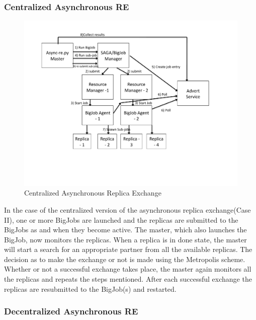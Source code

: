 \documentclass[a4paper,10pt]{article}
\begin{document}
\subsubsection{Centralized Asynchronous RE}

\begin{figure}
\centering
\includegraphics[scale=0.50]{figures/centralized_architecture}
\caption{\small Centralized Asynchronous Replica Exchange}
\label{fig:centralized}
\end{figure}

In the case of the centralized version of the asynchronous replica exchange(Case II), one or more BigJobs are
launched and the replicas are submitted to the BigJobs as and when they become active. The master, which also launches the BigJob,
now monitors the replicas. When a replica is in done state, the master will start a search for an appropriate partner from all the available replicas. The decision as to make the exchange or not is made using the Metropolis scheme. 
Whether or not a successful exchange takes place, the master again monitors all the replicas and  repeats the steps mentioned.
After each successful exchange the replicas are resubmitted to the BigJob(s) and restarted.

\subsubsection{Decentralized Asynchronous RE}
\end{document}
